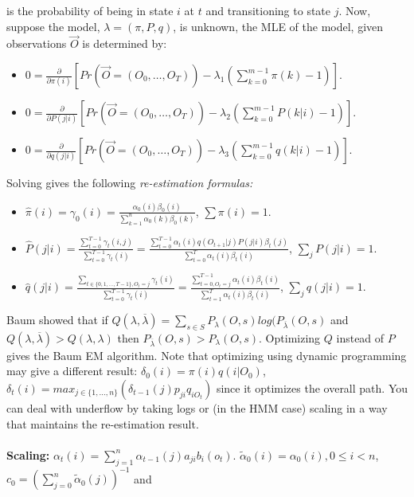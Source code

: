 is the probability of being in state $i$ at $t$ and transitioning to state $j$.
Now, suppose the model, $\lambda= (\pi, P, q)$, is unknown, the MLE of the
model, given observations ${\vec O}$ is determined by:
\begin {itemize}
\item
$0= {\frac {\partial} {\partial \pi(i)}}
[Pr({\vec O}=(O_0, \ldots, O_T))-\lambda_1(\sum_{k=0}^{m-1} \pi(k) -1)]$.
\item
$0= {\frac {\partial} {\partial P(j|i)}}
[Pr({\vec O}=(O_0, \ldots, O_T))-\lambda_2(\sum_{k=0}^{m-1} P(k|i)-1)]$.
\item
$0= {\frac {\partial} {\partial q(j|i)}}
[Pr( {\vec O}=(O_0, \ldots, O_T))-\lambda_3(\sum_{k=0}^{m-1} q(k|i)-1)]$.
\end {itemize}
Solving gives the following \emph{re-estimation formulas:}
\begin {itemize}
\item
${\hat {\pi}}(i) = \gamma_0(i)
= {\frac {\alpha_0(i) \beta_0(i)} {\sum_{k=1}^{n} \alpha_0(k) \beta_0(k)}}$, 
$\sum \pi(i)=1$.
\item
${\hat {P}}(j|i)= 
{\frac {\sum_{t=0}^{T-1} \gamma_t(i,j)} {\sum_{t=0}^{T-1} \gamma_t(i)}}=
{\frac {\sum_{t=0}^{T-1} \alpha_t(i) q(O_{t+1}|j) P(j|i) \beta_t(j)} 
{\sum_{t=0}^{T} \alpha_t(i) \beta_t(i)}}$,
$\sum_j P(j|i)=1$.
\item
${\hat {q}}(j|i)=  
{\frac {\sum_{t \in \{0,1,\ldots, T-1 \}, O_t=j} \gamma_t(i)} 
{\sum_{t=0}^{T-1} \gamma_t(i)}}=
{\frac {\sum_{t=0, O_t=j}^{T-1} \alpha_t(i) \beta_t(i)} 
{\sum_{t=1}^{T} \alpha_t(i) \beta_t(i)}}$,
$\sum_j q(j|i)=1$.
\end {itemize}
Baum showed that if $Q(\lambda, {\overline {\lambda}})= 
\sum_{s \in S} P_{\lambda}(O,s) log(P_{\overline {\lambda}}(O,s)$ and
$Q(\lambda, {\overline {\lambda}}) >
Q(\lambda, \lambda)$  then $P_{\overline {\lambda}}(O,s)> P_{\lambda}(O,s)$.
Optimizing $Q$ instead of $P$ gives the Baum EM algorithm.  Note that optimizing
using dynamic programming may give a different result: $\delta_0(i)= \pi(i) q(i|O_0)$,
$\delta_t(i)= max_{j \in \{1, \ldots, n\}} (\delta_{t-1}(j) p_{ji} q_{i O_t})$ since
it optimizes the overall path.  You can deal with underflow by taking logs or (in the
HMM case) scaling in a way that maintains the re-estimation result.
\\
\\
{\bf Scaling:} 
$\alpha_t(i)= \sum_{j=1}^{n} \alpha_{t-1}(j) a_{ji}b_i(o_t)$.
$\tilde{\alpha}_0(i)= \alpha_0(i), 0 \le i <n$, 
$c_0= (\sum_{j=0}^{n} \tilde{\alpha}_0(j))^{-1}$ and
